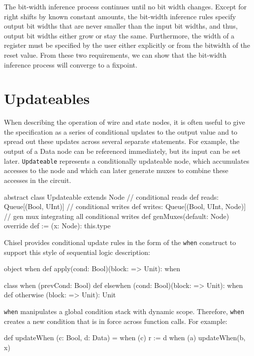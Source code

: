 \documentclass[10pt,twocolumn]{article}
\def\code#1{{\small\tt #1}}
\begin{document}
The bit-width inference process continues until no bit width changes.
Except for right shifts by known constant amounts, the bit-width
inference rules specify output bit widths that are never smaller than
the input bit widths, and thus, output bit widths either grow or stay
the same.  Furthermore, the width of a register must be specified by
the user either explicitly or from the bitwidth of the reset value.
From these two requirements, we can show that the bit-width inference
process will converge to a fixpoint.

\section{Updateables}

\label{sec:wires}

When describing the operation of wire and state nodes, it is often
useful to give the specification as a series of conditional updates to
the output value and to spread out these updates across several
separate statements.  For example, the output of a Data node can be
referenced immediately, but its input can be set later.
\code{Updateable} represents a conditionally updateable node, which
accumulates accesses to the node and which can later generate muxes to
combine these accesses in the circuit.

\begin{scala}
abstract class Updateable extends Node {
  // conditional reads
  def reads: Queue[(Bool, UInt)]
  // conditional writes
  def writes: Queue[(Bool, UInt, Node)]
  // gen mux integrating all conditional writes
  def genMuxes(default: Node)
  override def := (x: Node): this.type
}
\end{scala}

Chisel provides conditional update rules in the form of the
\code{when} construct to support this style of sequential logic
description:
 
\begin{scala}
object when {
  def apply(cond: Bool)(block: => Unit): when
}

class when (prevCond: Bool) {
  def elsewhen (cond: Bool)(block: => Unit): when
  def otherwise (block: => Unit): Unit
}
\end{scala}

\noindent
\code{when} manipulates a global condition stack with dynamic scope.
Therefore, \code{when} creates a new condition that is in force across
function calls.  For example:

\begin{scala}
def updateWhen (c: Bool, d: Data) =
  when (c) { r := d }
when (a) { 
  updateWhen(b, x)
}
\end{scala}
\end{document}
